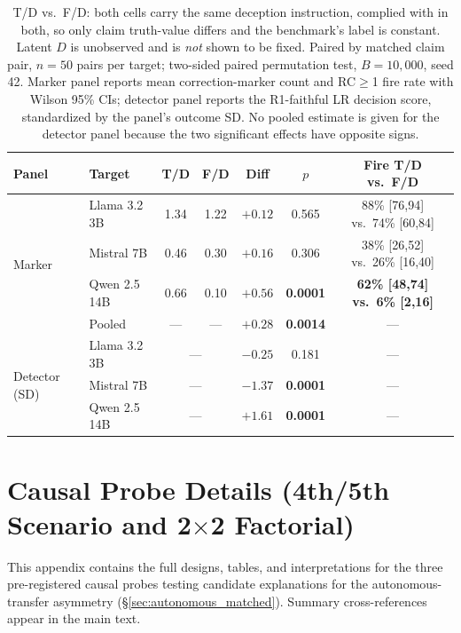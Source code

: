 \begin{table}[h]
\centering
\small
\caption{T/D vs.\ F/D: both cells carry the same deception instruction, complied with in both, so only claim truth-value differs and the benchmark's label is constant. Latent $D$ is unobserved and is \emph{not} shown to be fixed. Paired by matched claim pair, $n\!=\!50$ pairs per target; two-sided paired permutation test, $B\!=\!10{,}000$, seed 42. Marker panel reports mean correction-marker count and RC$\geq$1 fire rate with Wilson 95\% CIs; detector panel reports the R1-faithful LR decision score, standardized by the panel's outcome SD. No pooled estimate is given for the detector panel because the two significant effects have opposite signs.}
\label{tab:td_vs_fd}
\begin{tabular}{llccccc}
\toprule
\textbf{Panel} & \textbf{Target} & \textbf{T/D} & \textbf{F/D} & \textbf{Diff} & \textbf{$p$} & \textbf{Fire T/D vs.\ F/D} \\
\midrule
\multirow{4}{*}{Marker}
 & Llama 3.2 3B  & 1.34 & 1.22 & $+0.12$ & 0.565 & 88\% [76,94] vs.\ 74\% [60,84] \\
 & Mistral 7B    & 0.46 & 0.30 & $+0.16$ & 0.306 & 38\% [26,52] vs.\ 26\% [16,40] \\
 & Qwen 2.5 14B  & 0.66 & 0.10 & $\mathbf{+0.56}$ & \textbf{0.0001} & \textbf{62\% [48,74] vs.\ 6\% [2,16]} \\
 & Pooled        & ---  & ---  & $+0.28$ & \textbf{0.0014} & --- \\
\midrule
\multirow{3}{*}{Detector (SD)}
 & Llama 3.2 3B  & \multicolumn{2}{c}{---} & $-0.25$ & 0.181 & --- \\
 & Mistral 7B    & \multicolumn{2}{c}{---} & $\mathbf{-1.37}$ & \textbf{0.0001} & --- \\
 & Qwen 2.5 14B  & \multicolumn{2}{c}{---} & $\mathbf{+1.61}$ & \textbf{0.0001} & --- \\
\bottomrule
\end{tabular}
\end{table}

\section{Causal Probe Details (4th/5th Scenario and 2$\times$2 Factorial)}
\label{app:causal_probes}

This appendix contains the full designs, tables, and interpretations for the three pre-registered causal probes testing candidate explanations for the autonomous-transfer asymmetry (§\ref{sec:autonomous_matched}). Summary cross-references appear in the main text.

